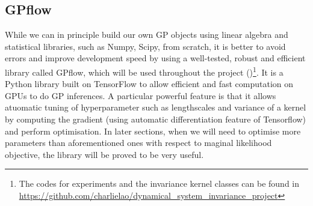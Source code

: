\documentclass{statsmsc}
\begin{document}
\subsection{GPflow}
While we can in principle build our own GP objects using linear algebra and statistical libraries, such as Numpy, Scipy, from scratch, it is better to avoid errors and improve development speed by using a well-tested, robust and efficient library called GPflow, which will be used throughout the project (\cite{GPflow2017})\footnote[1]{The codes for experiments and the invariance kernel classes can be found in \url{https://github.com/charlielao/dynamical\_system\_invariance\_project}}.
It is a Python library built on TensorFlow to allow efficient and fast computation on GPUs to do GP inferences.
A particular powerful feature is that it allows atuomatic tuning of hyperparameter such as lengthscales and variance of a kernel by computing the gradient (using automatic differentiation feature of Tensorflow) and perform optimisation.
In later sections, when we will need to optimise more parameters than aforementioned ones with respect to maginal likelihood objective, the library will be proved to be very useful.
\end{document}
